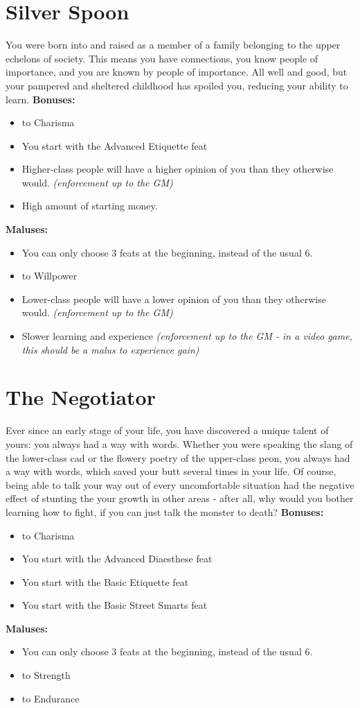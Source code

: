 \documentclass[openany,10pt,a4paper]{book}
\begin{document}
\section{Silver Spoon}
You were born into and raised as a member of a family belonging to the upper echelons of society. This means you have connections, you know people of importance, and you are known by people of importance. All well and good, but your pampered and sheltered childhood has spoiled you, reducing your ability to learn.\newline
\textbf{Bonuses:}
\begin{itemize}
	\item {} to Charisma
	\item You start with the Advanced Etiquette feat
	\item Higher-class people will have a higher opinion of you than they otherwise would. \textit{(enforcement up to the GM)}
	\item High amount of starting money.
\end{itemize}
\textbf{Maluses:}
\begin{itemize}
	\item You can only choose 3 feats at the beginning, instead of the usual 6.
	\item {} to Willpower
	\item Lower-class people will have a lower opinion of you than they otherwise would. \textit{(enforcement up to the GM)}
	\item Slower learning and experience \textit{(enforcement up to the GM - in a video game, this should be a malus to experience gain)}
\end{itemize}
\section{The Negotiator}
Ever since an early stage of your life, you have discovered a unique talent of yours: you always had a way with words. Whether you were speaking the slang of the lower-class cad or the flowery poetry of the upper-class peon, you always had a way with words, which saved your butt several times in your life. Of course, being able to talk your way out of every uncomfortable situation had the negative effect of stunting the your growth in other areas - after all, why would you bother learning how to fight, if you can just talk the monster to death?\newline
\textbf{Bonuses:}
\begin{itemize}
	\item {} to Charisma
	\item You start with the Advanced Diaesthese feat
	\item You start with the Basic Etiquette feat
	\item You start with the Basic Street Smarts feat
\end{itemize}
\textbf{Maluses:}
\begin{itemize}
	\item You can only choose 3 feats at the beginning, instead of the usual 6.
	\item {} to Strength
	\item {} to Endurance
\end{itemize}
\end{document}
